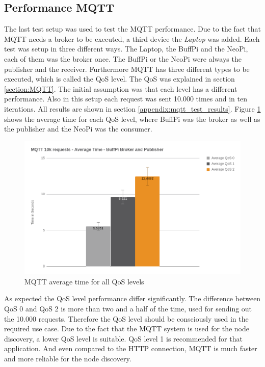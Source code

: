\subsection{Performance MQTT}
The last test setup was used to test the MQTT performance.
Due to the fact that MQTT needs a broker to be executed, a third device the \textit{Laptop} was added.
Each test was setup in three different ways.
The Laptop, the BuffPi and the NeoPi, each of them was the broker once.
The BuffPi or the NeoPi were always the publisher and the receiver.
Furthermore MQTT has three different types to be executed, which is called the \ac{QoS} level.
The \ac{QoS} was explained in section \ref{section:MQTT}.
The initial assumption was that each level has a different performance.
Also in this setup each request was sent 10.000 times and in ten iterations.
All results are shown in section \ref{appendix:mqtt_test_results}.
Figure \ref{fig:performance_mqtt_average_time_all_qos} shows the average time for each \ac{QoS} level, where BuffPi was the broker as well as the publisher and the NeoPi was the consumer.

\begin{figure}[H]
    \centering
    \includegraphics[width=\textwidth]{resources/images/performance_mqtt_average_time.png}
    \caption[MQTT average time for all QoS levels]{MQTT average time for all QoS levels}
    \label{fig:performance_mqtt_average_time_all_qos}
\end{figure}

As expected the \ac{QoS} level performance differ significantly.
The difference between \ac{QoS} 0 and \ac{QoS} 2 is more than two and a half of the time, used for sending out the 10.000 requests.
Therefore the \ac{QoS} level should be consciously used in the required use case.
Due to the fact that the MQTT system is used for the node discovery, a lower \ac{QoS} level is suitable.
\ac{QoS} level 1 is recommended for that application.
And even compared to the \ac{HTTP} connection, MQTT is much faster and more reliable for the node discovery.\newline

